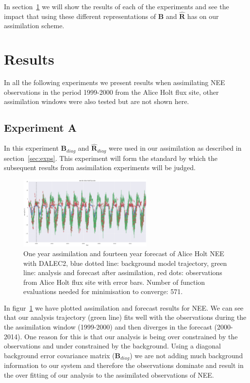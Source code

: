 \documentclass[11pt]{article}
\begin{document}
In section~\ref{sec:results} we will show the results of each of the experiments and see the impact that using these different representations of $\textbf{B}$ and $\hat{\mathbf{R}}$ has on our assimilation scheme.

\section{Results} \label{sec:results}

In all the following experiments we present results when assimilating NEE observations in the period 1999-2000 from the Alice Holt flux site, other assimilation windows were also tested but are not shown here.

\subsection{Experiment A} \label{sec:expa}
In this experiment $\textbf{B}_{diag}$ and $\hat{\textbf{R}}_{diag}$ were used in our assimilation as described in section~\ref{sec:exps}. This experiment will form the standard by which the subsequent results from assimilation experiments will be judged. 

\begin{figure}[ht]
    \centering
    \includegraphics[width=0.6\textwidth]{bdiagNone_4dvar.png}
    \caption{One year assimilation and fourteen year forecast of Alice Holt NEE with DALEC2, blue dotted line: background model trajectory, green line: analysis and forecast after assimilation, red dots: observations from Alice Holt flux site with error bars. Number of function evaluations needed for minimisation to converge: 571.}
    \label{fig:4dvardiagBR}
\end{figure}

In figur~\ref{fig:4dvardiagBR} we have plotted assimilation and forecast results for NEE. We can see that our analysis trajectory (green line) fits well with the observations during the the assimilation window (1999-2000) and then diverges in the forecast (2000-2014). One reason for this is that our analysis is being over constrained by the observations and under constrained by the background. Using a diagonal background error covariance matrix ($\textbf{B}_{diag}$) we are not adding much background information to our system and therefore the observations dominate and result in the over fitting of our analysis to the assimilated observations of NEE.
\end{document}
